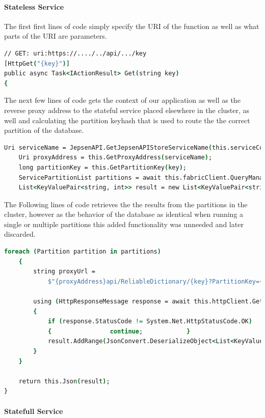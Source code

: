 \documentclass[a4paper,10pt,titlepage]{report}
\begin{document}
        \paragraph{Stateless Service}
        The first first lines of code simply specify the URI of the function as well as what parts of the URI are parameters.
\begin{lstlisting}[language=csh]
// GET: uri:https://..../../api/.../key
[HttpGet("{key}")]
public async Task<IActionResult> Get(string key)
{
\end{lstlisting}   
The next few lines of code gets the context of our application as well as the reverse proxy address to the stateful service placed elsewhere in the cluster, as well and calculating the partition keyhash that is used to route the the correct partition of the database.
\begin{lstlisting}[language=csh]
    Uri serviceName = JepsenAPI.GetJepsenAPIStoreServiceName(this.serviceContext);
    Uri proxyAddress = this.GetProxyAddress(serviceName);
    long partitionKey = this.GetPartitionKey(key);
    ServicePartitionList partitions = await this.fabricClient.QueryManager.GetPartitionListAsync(serviceName);
    List<KeyValuePair<string, int>> result = new List<KeyValuePair<string, int>>();
\end{lstlisting}   

The Following lines of code retrieves the the results from the partitions in the cluster, however as the behavior of the database as identical when running a single or multiple partitions this added functionality was unneeded and later discarded.

\begin{lstlisting}[language=csh]
    foreach (Partition partition in partitions)
    {
        string proxyUrl =
            $"{proxyAddress}api/ReliableDictionary/{key}?PartitionKey={partitionKey}&PartitionKind=Int64Range";

        using (HttpResponseMessage response = await this.httpClient.GetAsync(proxyUrl))
        {
            if (response.StatusCode != System.Net.HttpStatusCode.OK)
            {                continue;            }
            result.AddRange(JsonConvert.DeserializeObject<List<KeyValuePair<string, int>>>(await response.Content.ReadAsStringAsync()));
        }
    }

    return this.Json(result);
}
\end{lstlisting}  

\paragraph{Statefull Service}
\end{document}
